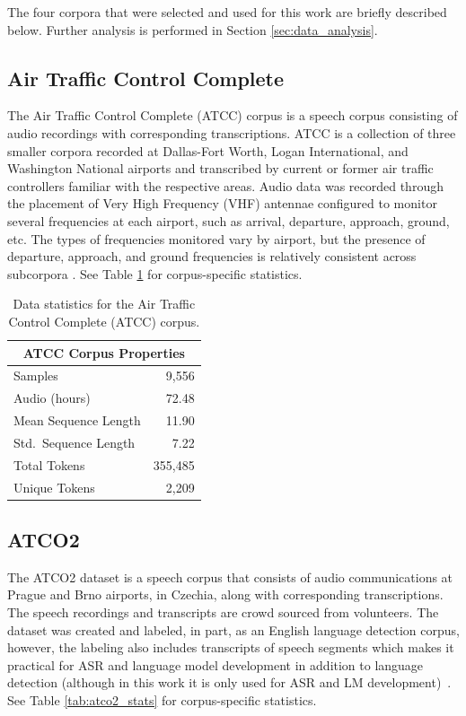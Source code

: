 \documentclass[12pt]{article}
\begin{document}
The four corpora that were selected and used for this work are briefly described below. Further analysis is performed in Section
\ref{sec:data_analysis}.

\subsection{Air Traffic Control Complete}\label{sec:atcc}
The Air Traffic Control Complete (ATCC) corpus is a speech corpus consisting of audio recordings with corresponding transcriptions.
ATCC is a collection of three smaller corpora recorded at Dallas-Fort Worth, Logan International, and Washington National airports and
transcribed by current or former air traffic controllers familiar with the respective areas. Audio data was recorded through the placement of Very
High Frequency (VHF) antennae configured to monitor several frequencies at each airport, such as arrival, departure, approach, ground, etc. The types
of frequencies monitored vary by airport, but the presence of departure, approach, and ground frequencies is relatively consistent across subcorpora
\cite{godfrey_air_1994}. See Table \ref{tab:atcc_stats} for corpus-specific statistics.

\begin{table}
    \centering
    \begin{tabular}{l r}
        \toprule
        \multicolumn{2}{c}{ATCC Corpus Properties} \\
        \midrule
        Samples              & 9,556               \\
        Audio (hours)        & 72.48               \\
        Mean Sequence Length & 11.90               \\
        Std.~Sequence Length & 7.22                \\

        Total Tokens         & 355,485             \\
        Unique Tokens        & 2,209               \\
        \bottomrule
    \end{tabular}
    \caption{Data statistics for the Air Traffic Control Complete (ATCC) corpus.}
    \label{tab:atcc_stats}
\end{table}

\subsection{ATCO2}\label{sec:atco2}
The ATCO2 dataset is a speech corpus that consists of audio communications at Prague and Brno airports, in Czechia, along with corresponding
transcriptions. The speech recordings and transcripts are crowd sourced from volunteers. The dataset was created and labeled, in part, as an English
language detection corpus, however, the labeling also includes transcripts of speech segments which makes it practical for ASR and language model
development in addition to language detection (although in this work it is only used for ASR and LM development)~\cite{szoke_detecting_2021}.
See Table \ref{tab:atco2_stats} for corpus-specific statistics.
\end{document}
